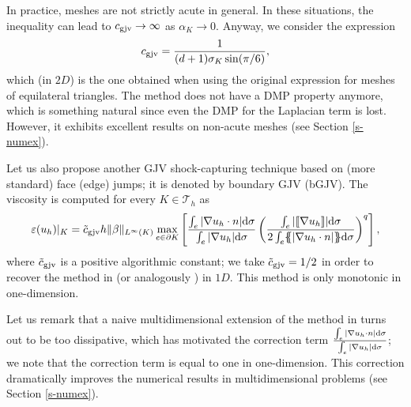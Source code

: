 In practice, meshes are not strictly acute in general. In these situations, the inequality  can lead to $c_{\rm gjv} \to \infty$ as $\alpha_K \to 0$. Anyway, we consider the expression 
\begin{align*}%
c_{\rm gjv} = \frac{1}{(d+1) \sigma_K \sin (\pi/6)},
\end{align*}
which (in $2D$) is the one obtained when using the original expression for meshes of equilateral triangles. The method does not have a DMP property anymore, which is something natural since even the DMP for the Laplacian term is lost. However, it exhibits excellent results on non-acute meshes (see Section \ref{s-numex}).

Let us also propose another GJV shock-capturing technique based on (more standard) face (edge) jumps; it is denoted by boundary GJV (bGJV). The viscosity is computed for every $K \in \mathcal{T}_h$ as 
\begin{align}\label{eq-gjvisc}
\varepsilon(u_h)|_K = \tilde c_{\rm gjv} h \|\beta\|_{L^\infty(K)} \max_{e \in \partial K}\left[\frac{\int_e |\nabla u_h \cdot n|{\rm d} \sigma}{\int_e |\nabla u_h| {\rm d} \sigma}\left(\frac{\int_e  | \lbrack\!\lbrack \nabla u_h \rbrack\!\rbrack|{\rm d} \sigma }{ 2 \int_e \{\! \!\{ |\nabla u_h \cdot n|\}\! \!\} {\rm d} \sigma}\right)^q\right],
\end{align}
where $\tilde c_{\rm gjv}$ is a positive algorithmic constant; we take $\tilde c_{\rm gjv} = 1/2$ in order to recover the method in  \cite{burman_nonlinear_2007} (or analogously ) in $1D$. This method is only monotonic in one-dimension. 

\begin{remark} Let us remark that a naive multidimensional extension of the method in \cite{burman_nonlinear_2007} turns out to be too dissipative, which has motivated the correction term  $\frac{\int_e |\nabla u_h \cdot n|{\rm d} \sigma}{\int_e |\nabla u_h| {\rm d} \sigma}$; we note that the correction term is equal to one in one-dimension. This correction dramatically improves the numerical results in multidimensional problems (see Section \ref{s-numex}).
\end{remark}


